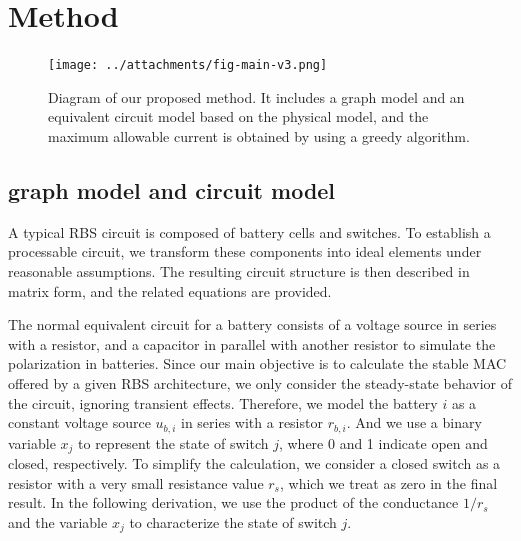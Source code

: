 \documentclass{article}
\begin{document}
\section{Method}


\begin{figure}
    \centering
    \texttt{[image: ../attachments/fig-main-v3.png]}
    \caption{Diagram of our proposed method. It includes a graph model and an equivalent circuit model based on the physical model, and the maximum allowable current is obtained by using a greedy algorithm.}
    \label{fig:main}
\end{figure}

\subsection{graph model and circuit model}

A typical RBS circuit is composed of battery cells and switches.
To establish a processable circuit, we transform these components into ideal elements under reasonable assumptions.
The resulting circuit structure is then described in matrix form, and the related equations are provided.


The normal equivalent circuit for a battery consists of a voltage source in series with a resistor, and a capacitor in parallel with another resistor to simulate the polarization in batteries.
Since our main objective is to calculate the stable MAC offered by a given RBS architecture, we only consider the steady-state behavior of the circuit, ignoring transient effects.
Therefore, we model the battery $i$ as a constant voltage source $u_{b,i}$ in series with a resistor $r_{b,i}$.
And we use a binary variable $x_j$ to represent the state of switch $j$, where 0 and 1 indicate open and closed, respectively.
To simplify the calculation, we consider a closed switch as a resistor with a very small resistance value $r_s$, which we treat as zero in the final result.
In the following derivation, we use the product of the conductance $1/r_s$ and the variable $x_j$ to characterize the state of switch $j$.
\end{document}
